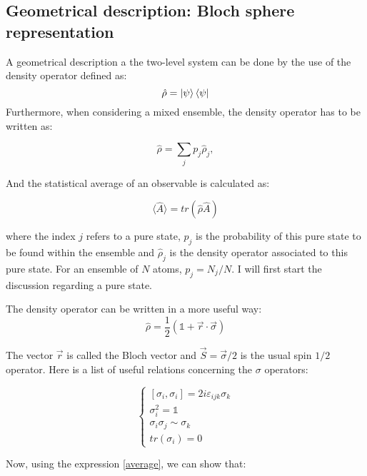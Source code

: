 \subsection{Geometrical description: Bloch sphere representation}

A geometrical description a the two-level system can be done by the use of the density operator defined as:
\begin{equation}
    \hat{\rho} = \ket{\psi} \bra{\psi}
\end{equation}
Furthermore, when considering a mixed ensemble, the density operator has to be written as:

\begin{equation}
    \hat{\rho} = \sum_{j} p_{j} \hat{\rho}_{j}, 
\end{equation}

And the statistical average of an observable is calculated as:

\begin{equation} \label{average}
    \langle \hat{A} \rangle = tr(\hat{\rho} \hat{A})
\end{equation}

where the index $j$ refers to a pure state, $p_{j}$ is the probability of this pure state to be found within the ensemble and $\hat{\rho}_{j}$ is the density operator associated to this pure state. For an ensemble of $N$ atoms, $p_{j} = N_{j}/N$. I will first start the discussion regarding a pure state. 

The density operator can be written in a more useful way:
\begin{equation}
    \hat{\rho} = \frac{1}{2} (\mathbb{1} + \vec{r} \cdot \vec{\sigma})
\end{equation}

The vector $\vec{r}$ is called the Bloch vector and $\vec{S} = \vec{\sigma}/2$ is the usual spin $1/2$ operator.
Here is a list of useful relations concerning the $\sigma$ operators:

\begin{equation}
\begin{cases}
    [\sigma_{i}, \sigma_i]  = 2 i \varepsilon_{ijk} \sigma_{k} \\
    \sigma_{i}^{2} = \mathbb{1} \\
    \sigma_{i} \sigma_{j} \sim \sigma_{k} \\
    tr(\sigma_{i}) = 0
\end{cases}
\end{equation}

Now, using the expression \ref{average}, we can show that:

